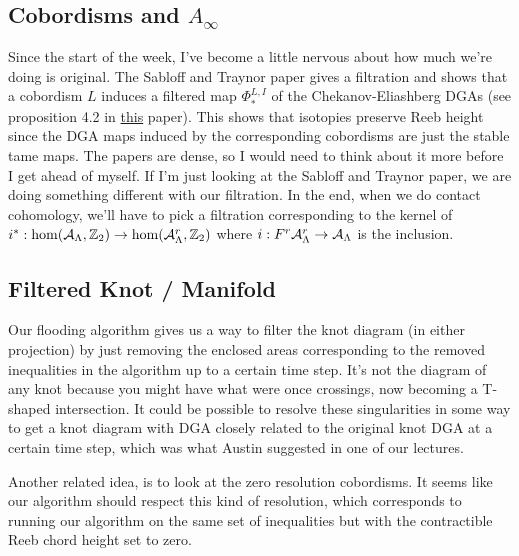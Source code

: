 \documentclass[11pt,oneside]{amsart}
\begin{document}
\subsection*{Cobordisms and $A_\infty$} Since the start of the week, I've become a little nervous about how much we're doing is original. The Sabloff and Traynor paper gives a filtration and shows that a cobordism $L$ induces a filtered map $\Phi_\ast^{L,I}$ of the Chekanov-Eliashberg DGAs (see proposition 4.2 in \href{https://arxiv.org/pdf/2101.03760.pdf}{this} paper). This shows that isotopies preserve Reeb height since the DGA maps induced by the corresponding cobordisms are just the stable tame maps. The papers are dense, so I would need to think about it more before I get ahead of myself. If I'm just looking at the Sabloff and Traynor paper, we are doing something different with our filtration. In the end, when we do contact cohomology, we'll have to pick a filtration corresponding to the kernel of $i^\ast:\hom(\mathcal{A}_{\Lambda}, \mathbb Z_2)\rightarrow \hom(\mathcal{A}_{\Lambda}^r, \mathbb Z_2)$ where $i:F^r \mathcal{A}_{\Lambda}^r\rightarrow \mathcal{A}_{\Lambda}$ is the inclusion.


\subsection*{Filtered Knot / Manifold} 

Our flooding algorithm gives us a way to filter the knot diagram (in either projection) by just removing the enclosed areas corresponding to the removed inequalities in the algorithm up to a certain time step. It's not the diagram of any knot because you might have what were once crossings, now becoming a T-shaped intersection. It could be possible to resolve these singularities in some way to get a knot diagram with DGA closely related to the original knot DGA at a certain time step, which was what Austin suggested in one of our lectures.

Another related idea, is to look at the zero resolution cobordisms. It seems like our algorithm should respect this kind of resolution, which corresponds to running our algorithm on the same set of inequalities but with the contractible Reeb chord height set to zero.
\end{document}
